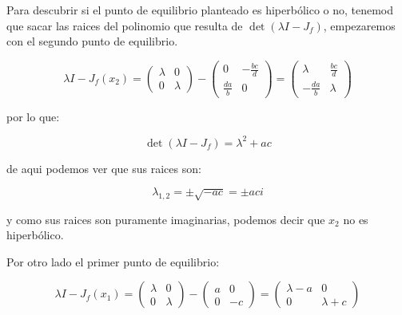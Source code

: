             Para descubrir si el punto de equilibrio planteado es hiperbólico o no, tenemod que sacar las raices del polinomio que resulta de $\det{(\lambda I - J_f)}$, empezaremos con el segundo punto de equilibrio.

            \begin{equation*}
                \lambda I - J_f(x_2) =
                \begin{pmatrix}
                    \lambda & 0 \\
                    0 & \lambda
                \end{pmatrix} -
                \begin{pmatrix}
                    0 & -\frac{bc}{d} \\
                    \frac{da}{b} & 0
                \end{pmatrix} =
                \begin{pmatrix}
                    \lambda & \frac{bc}{d} \\
                    -\frac{da}{b} & \lambda
                \end{pmatrix}
            \end{equation*}

            por lo que:

            \begin{equation*}
                \det{(\lambda I - J_f)} = \lambda^2 + ac
            \end{equation*}

            de aqui podemos ver que sus raices son:

            \begin{equation*}
                \lambda_{1,2} = \pm \sqrt{-ac} = \pm ac i 
            \end{equation*}

            y como sus raices son puramente imaginarias, podemos decir que $x_2$ no es hiperbólico.

            Por otro lado el primer punto de equilibrio:

            \begin{equation*}
                \lambda I - J_f(x_1) =
                \begin{pmatrix}
                    \lambda & 0 \\
                    0 & \lambda
                \end{pmatrix} -
                \begin{pmatrix}
                    a & 0 \\
                    0 & -c
                \end{pmatrix} =
                \begin{pmatrix}
                    \lambda - a & 0 \\
                    0 & \lambda + c
                \end{pmatrix}
            \end{equation*}

